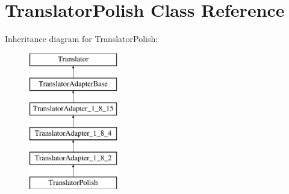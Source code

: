 \hypertarget{class_translator_polish}{}\section{Translator\+Polish Class Reference}
\label{class_translator_polish}
Inheritance diagram for Translator\+Polish\+:\begin{figure}[H]
\begin{center}
\leavevmode
\includegraphics[height=6.000000cm]{class_translator_polish}
\end{center}
\end{figure}
